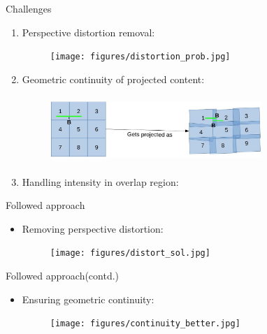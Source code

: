 \documentclass{beamer}
\begin{document}

\begin{frame}{Challenges}
\begin{enumerate}
\item Perspective distortion removal:
\begin{figure}
\texttt{[image: figures/distortion\_prob.jpg]}
\end{figure} 
\item Geometric continuity of projected content:
\begin{figure}
\includegraphics[width=8cm, height=2.5cm]{figures/continuity_prob.jpg}
\end{figure}
\item Handling intensity in overlap region:
\end{enumerate}
\end{frame}


\begin{frame}{Followed approach}
\begin{itemize}
\item Removing perspective distortion:
\begin{figure}
\texttt{[image: figures/distort\_sol.jpg]}
\end{figure}
\end{itemize}
\end{frame}


\begin{frame}{Followed approach(contd.)}
\begin{itemize}
\item Ensuring geometric continuity:
\begin{figure}
\texttt{[image: figures/continuity\_better.jpg]}
\end{figure}
\end{itemize}
\end{frame}
\end{document}
